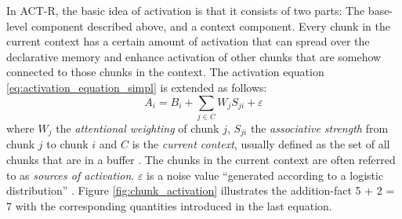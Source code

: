 In ACT-R, the basic idea of activation is that it consists of two parts: The base-level component described above, and a context component. Every chunk in the current context has a certain amount of activation that can spread over the declarative memory and enhance activation of other chunks that are somehow connected to those chunks in the context. The activation equation \eqref{eq:activation_equation_simpl} is extended as follows:
\begin{equation}
\label{eq:activation_equation}
 A_i = B_i + \sum_{j \in C}{W_j S_{ji}} + \varepsilon
\end{equation}
where $W_j$ the \emph{attentional weighting} of chunk $j$, $S_{ji}$ the \emph{associative strength} from chunk $j$ to chunk $i$ and $C$ is the \emph{current context}\label{current_context}, usually defined as the set of all chunks that are in a buffer \cites[1042]{anderson_integrated_2004}[33]{taatgen_modeling_2006}[unit 5]{actr_tutorial}. The chunks in the current context are often referred to as \emph{sources of activation}. $\varepsilon$ is a noise value ``generated according to a logistic distribution'' \cite[unit 4, p. 4]{actr_tutorial}. Figure \ref{fig:chunk_activation} illustrates the addition-fact 5 + 2 = 7 with the corresponding quantities introduced in the last equation. 

